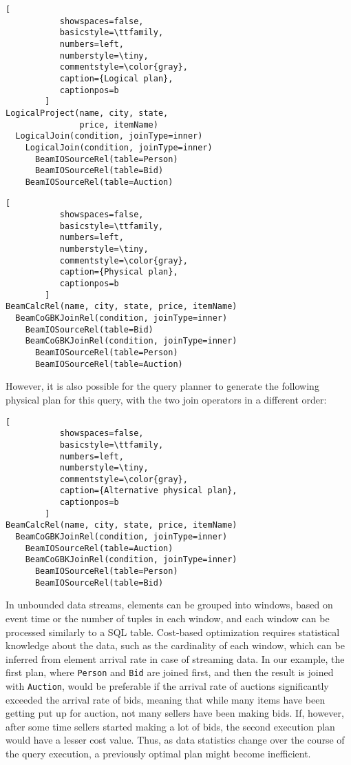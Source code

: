 \begin{lstlisting}[
           showspaces=false,
           basicstyle=\ttfamily,
           numbers=left,
           numberstyle=\tiny,
           commentstyle=\color{gray},
           caption={Logical plan}, 
           captionpos=b
        ]
LogicalProject(name, city, state, 
               price, itemName)
  LogicalJoin(condition, joinType=inner) 
    LogicalJoin(condition, joinType=inner)
      BeamIOSourceRel(table=Person)
      BeamIOSourceRel(table=Bid)
    BeamIOSourceRel(table=Auction)
\end{lstlisting}

\begin{lstlisting}[
           showspaces=false,
           basicstyle=\ttfamily,
           numbers=left,
           numberstyle=\tiny,
           commentstyle=\color{gray},
           caption={Physical plan}, 
           captionpos=b
        ]
BeamCalcRel(name, city, state, price, itemName)
  BeamCoGBKJoinRel(condition, joinType=inner)
    BeamIOSourceRel(table=Bid)
    BeamCoGBKJoinRel(condition, joinType=inner)
      BeamIOSourceRel(table=Person)
      BeamIOSourceRel(table=Auction)
\end{lstlisting}

However, it is also possible for the query planner to generate the following physical plan for this query, with the two join operators in a different order:

\begin{lstlisting}[
           showspaces=false,
           basicstyle=\ttfamily,
           numbers=left,
           numberstyle=\tiny,
           commentstyle=\color{gray},
           caption={Alternative physical plan}, 
           captionpos=b
        ]
BeamCalcRel(name, city, state, price, itemName)
  BeamCoGBKJoinRel(condition, joinType=inner)
    BeamIOSourceRel(table=Auction)
    BeamCoGBKJoinRel(condition, joinType=inner)
      BeamIOSourceRel(table=Person)
      BeamIOSourceRel(table=Bid)        
\end{lstlisting}


In unbounded data streams, elements can be grouped into windows, based on event time or the number of tuples in each window, and each window can be processed similarly to a SQL table. Cost-based optimization requires statistical knowledge about the data, such as the cardinality of each window, which can be inferred from element arrival rate in case of streaming data. In our example, the first plan, where \texttt{Person} and \texttt{Bid} are joined first, and then the result is joined with \texttt{Auction}, would be preferable if the arrival rate of auctions significantly exceeded the arrival rate of bids, meaning that while many items have been getting put up for auction, not many sellers have been making bids. If, however, after some time sellers started making a lot of bids, the second execution plan would have a lesser cost value. Thus, as data statistics change over the course of the query execution, a previously optimal plan might become inefficient. 

